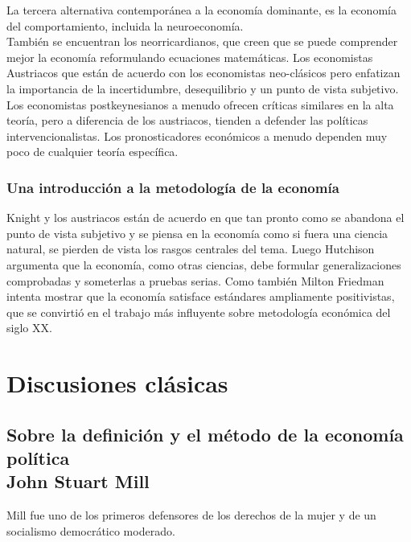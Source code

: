 La tercera alternativa contemporánea a la economía dominante, es la economía del comportamiento, incluida la neuroeconomía. \\

También se encuentran los neorricardianos, que creen que se puede comprender mejor la economía reformulando ecuaciones matemáticas. Los economistas Austriacos que están de acuerdo con los economistas neo-clásicos pero enfatizan la importancia de la incertidumbre, desequilibrio y un punto de vista subjetivo. Los economistas postkeynesianos a menudo ofrecen críticas similares en la alta teoría, pero a diferencia de los austriacos, tienden a defender las políticas intervencionalistas.  Los pronosticadores económicos a menudo dependen muy poco de cualquier teoría específica. 


\section{Una introducción a la metodología de la economía}

Knight y los austriacos están de acuerdo en que tan pronto como se abandona el punto de vista subjetivo y se piensa en la economía como si fuera una ciencia natural, se pierden de vista los rasgos centrales del tema. Luego Hutchison argumenta que la economía, como otras ciencias, debe formular generalizaciones comprobadas y someterlas a pruebas serias. Como también Milton Friedman intenta mostrar que la economía satisface estándares ampliamente positivistas, que se convirtió en el trabajo más influyente sobre metodología económica del siglo XX.


\part{Discusiones clásicas}

\chapter{Sobre la definición y el método de la economía política\\ John Stuart Mill}

Mill fue uno de los primeros defensores de los derechos de la mujer y de un socialismo democrático moderado.\\

